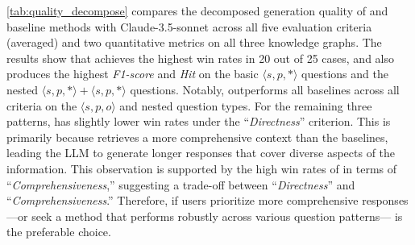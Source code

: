  \autoref{tab:quality_decompose} compares the decomposed generation quality of \name{} and baseline methods with Claude-3.5-sonnet across all five evaluation criteria (averaged) and two quantitative metrics on all three knowledge graphs. The results show that \name{} achieves the highest win rates in 20 out of 25 cases, and also produces the highest \textit{F1-score} and \textit{Hit} on the basic $\langle s,p,* \rangle$ questions and the nested $\langle s,p,* \rangle + \langle s,p,* \rangle$ questions. Notably, \name{} outperforms all baselines across all criteria on the $\langle s,p,o \rangle$ and nested question types. For the remaining three patterns, \name{} has slightly lower win rates under the ``\textit{Directness}'' criterion. This is primarily because \name{} retrieves a more comprehensive context than the baselines, leading the LLM to generate longer responses that cover diverse aspects of the information. This observation is supported by the high win rates of \name{} in terms of ``\textit{Comprehensiveness},'' suggesting a trade-off between ``\textit{Directness}'' and ``\textit{Comprehensiveness}.'' Therefore, if users prioritize more comprehensive responses—or seek a method that performs robustly across various question patterns—\name{} is the preferable choice.


